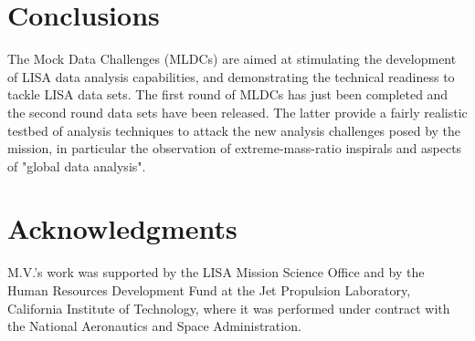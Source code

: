 \documentclass[12pt]{iopart}
\begin{document}
\section{Conclusions}

The Mock Data Challenges (MLDCs) are aimed at stimulating the development of LISA data analysis capabilities, and demonstrating the technical readiness to tackle LISA data sets. The first round of MLDCs has just been completed and the second round data sets have been released. The latter provide a fairly realistic testbed of analysis techniques to attack the new analysis challenges posed by the mission, in particular the observation of extreme-mass-ratio inspirals and aspects of "global data analysis". 


\section*{Acknowledgments}
M.V.'s work was supported by the LISA Mission Science Office and by the Human Resources Development Fund at the Jet Propulsion Laboratory, California Institute of Technology, where it was performed under contract with the National Aeronautics and Space Administration.
\end{document}
